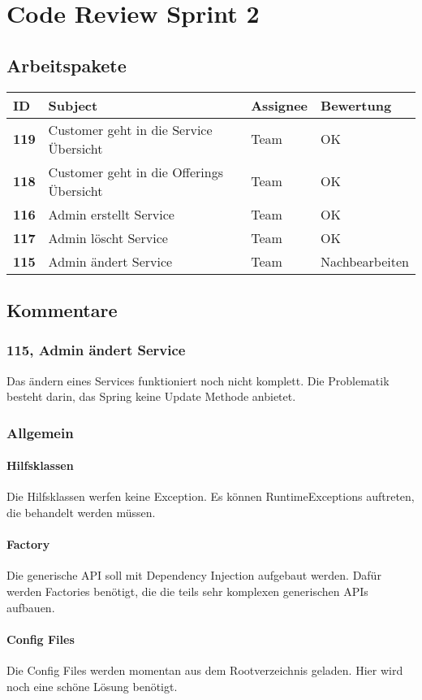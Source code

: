 
\chapter{Code Review Sprint 2}
\section{Arbeitspakete}

\begin{center}

\begin{tabularx}{\linewidth}{l l l l}
\textbf{ID} & \textbf{Subject} & \textbf{Assignee} & \textbf{Bewertung}\\
\hline
\textbf{119} & Customer geht in die Service Übersicht & Team & OK \\
\textbf{118} & Customer geht in die Offerings Übersicht & Team & OK\\
\textbf{116} & Admin erstellt Service & Team & OK\\
\textbf{117} & Admin löscht Service & Team & OK\\
\textbf{115} & Admin ändert Service & Team & Nachbearbeiten\\
\end{tabularx}

\end{center}
\newpage

\section{Kommentare}

\subsection{115, Admin ändert Service}
Das ändern eines Services funktioniert noch nicht komplett. Die Problematik besteht darin, das Spring keine Update Methode anbietet.

\subsection{Allgemein}
\subsubsection{Hilfsklassen}
Die Hilfsklassen werfen keine Exception.
Es können RuntimeExceptions auftreten, die behandelt werden müssen.

\subsubsection{Factory}
Die generische API soll mit Dependency Injection aufgebaut werden.
Dafür werden Factories benötigt, die die teils sehr komplexen generischen APIs aufbauen.

\subsubsection{Config Files}
Die Config Files werden momentan aus dem Rootverzeichnis geladen.
Hier wird noch eine schöne Lösung benötigt.
